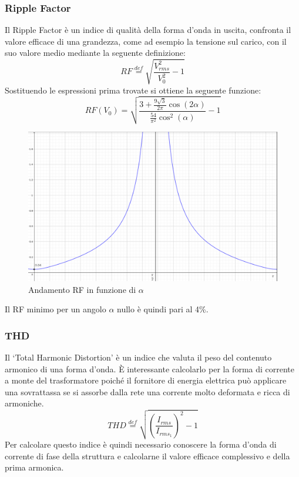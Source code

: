 \documentclass[a4paper,11pt]{article}
\begin{document}
\subsubsection{Ripple Factor}
Il Ripple Factor è un indice di qualità della forma d'onda in uscita, confronta
il valore efficace di una grandezza, come ad esempio la tensione sul carico, con il 
suo valore medio mediante la seguente definizione:
\begin{equation}
 RF \stackrel{def}{=} \sqrt{\frac{V_{rms}^2}{V_0^2}-1}
 \label{eq:ripple_factor}
\end{equation}
Sostituendo le espressioni prima trovate si ottiene la seguente funzione:
\begin{equation*}
 RF(V_0) = \sqrt{\frac{3+\frac{9\sqrt{3}}{2\pi}\cos(2\alpha)}{\frac{54}{\pi^2}\cos^2(\alpha)}-1}
\end{equation*}
\begin{figure}[H]
 \centering
 \includegraphics[keepaspectratio=true,width=0.8\linewidth]
 {RFV_0.png}
 \caption{Andamento RF in funzione di \(\alpha\)}
\end{figure}
Il RF minimo per un angolo \(\alpha\) nullo è quindi pari al 4\%.

\subsubsection{THD}
Il `Total Harmonic Distortion' è un indice che valuta il peso del contenuto armonico
di una forma d'onda. È interessante calcolarlo per la forma di corrente a monte del
trasformatore poiché il fornitore di energia elettrica può applicare una sovrattassa
se si assorbe dalla rete una corrente molto deformata e ricca di armoniche.
\begin{equation}
 THD \stackrel{def}{=} \sqrt{\left(\frac{I_{rms}}{I_{rms_{1}}}\right)^2-1}
 \label{eq:THD}
\end{equation}
Per calcolare questo indice è quindi necessario conoscere la forma d'onda di corrente
di fase della struttura e calcolarne il valore efficace complessivo e della prima 
armonica.
\smallskip
\end{document}
